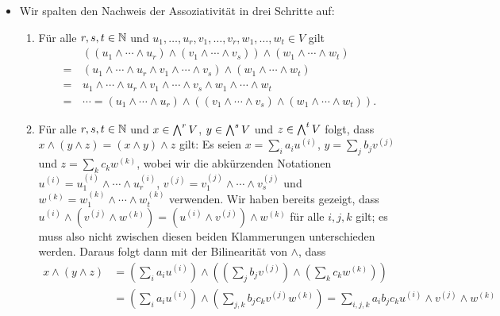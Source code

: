 \begin{itemize}
  \item
    Wir spalten den Nachweis der Assoziativität in drei Schritte auf:
    \begin{enumerate}
      \item
        Für alle $r, s, t \in \mathbb{N}$ und  $u_1, \dotsc, u_r, v_1, \dotsc, v_r, w_1, \dotsc, w_t \in V$ gilt
        \begin{align*}
           &\,  ( (u_1 \wedge \dotsb \wedge u_r) \wedge (v_1 \wedge \dotsb \wedge v_s) ) \wedge (w_1 \wedge \dotsb \wedge w_t)
          \\
          =&\,  ( u_1 \wedge \dotsb \wedge u_r \wedge v_1 \wedge \dotsb \wedge v_s ) \wedge (w_1 \wedge \dotsb \wedge w_t)
          \\
          =&\,  u_1 \wedge \dotsb \wedge u_r \wedge v_1 \wedge \dotsb \wedge v_s \wedge w_1 \wedge \dotsb \wedge w_t
          \\
          =&\,  \dotsb
          =     (u_1 \wedge \dotsb \wedge u_r) \wedge ((v_1 \wedge \dotsb \wedge v_s) \wedge (w_1 \wedge \dotsb \wedge w_t)).
        \end{align*}
      \item
        Für alle $r, s, t \in \mathbb{N}$ und $x \in \bigwedge^{r} V$, $y \in \bigwedge^{s} V$ und $z \in \bigwedge^{t} V$ folgt, dass $x \wedge (y \wedge z) = (x \wedge y) \wedge z$ gilt:
        Es seien $x = \sum_i a_i u^{(i)}$, $y = \sum_j b_j v^{(j)}$ und $z = \sum_k c_k w^{(k)}$, wobei wir die abkürzenden Notationen $u^{(i)} = u^{(i)}_1 \wedge \dotsb \wedge u^{(i)}_r$, $v^{(j)} = v^{(j)}_1 \wedge \dotsb \wedge v^{(j)}_s$ und $w^{(k)} = w^{(k)}_1 \wedge \dotsb \wedge w^{(k)}_t$ verwenden.
        Wir haben bereits gezeigt, dass $u^{(i)} \wedge (v^{(j)} \wedge w^{(k)}) = (u^{(i)} \wedge v^{(j)}) \wedge w^{(k)}$ für alle $i,j,k$ gilt;
        es muss also nicht zwischen diesen beiden Klammerungen unterschieden werden.
        Daraus folgt dann mit der Bilinearität von $\wedge$, dass
        \begin{align*}
              x \wedge (y \wedge z)
          &=          \left( \sum_i a_i u^{(i)} \right)
              \wedge  \left( \left( \sum_j b_j v^{(j)} \right) \wedge \left( \sum_k c_k w^{(k)} \right) \right)
          \\
          &=  \left( \sum_i a_i u^{(i)} \right) \wedge \left( \sum_{j,k} b_j c_k v^{(j)} w^{(k)} \right)
          =   \sum_{i,j,k} a_i b_j c_k u^{(i)} \wedge v^{(j)} \wedge w^{(k)}
          \\

\end{align*}
\end{enumerate}
\end{itemize}
